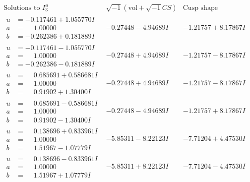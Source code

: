 \documentclass[1p]{elsarticle_modified}
\theoremstyle{definition}
\newcommand{\I}{\sqrt{-1}}
\begin{document}
$$\begin{array}{c|c|c}  
\text{Solutions to }I^u_{3}& \I (\text{vol} + \sqrt{-1}CS) & \text{Cusp shape}\\
 \hline 
\begin{aligned}
u &= -0.117461 + 1.055770 I \\
a &= \phantom{-}1.00000\phantom{ +0.000000I} \\
b &= -0.262386 + 0.181889 I\end{aligned}
 & -0.27448 - 4.94689 I & -1.21757 + 8.17867 I \\ \hline\begin{aligned}
u &= -0.117461 - 1.055770 I \\
a &= \phantom{-}1.00000\phantom{ +0.000000I} \\
b &= -0.262386 - 0.181889 I\end{aligned}
 & -0.27448 + 4.94689 I & -1.21757 - 8.17867 I \\ \hline\begin{aligned}
u &= \phantom{-}0.685691 + 0.586681 I \\
a &= \phantom{-}1.00000\phantom{ +0.000000I} \\
b &= \phantom{-}0.91902 + 1.30400 I\end{aligned}
 & -0.27448 + 4.94689 I & -1.21757 - 8.17867 I \\ \hline\begin{aligned}
u &= \phantom{-}0.685691 - 0.586681 I \\
a &= \phantom{-}1.00000\phantom{ +0.000000I} \\
b &= \phantom{-}0.91902 - 1.30400 I\end{aligned}
 & -0.27448 - 4.94689 I & -1.21757 + 8.17867 I \\ \hline\begin{aligned}
u &= \phantom{-}0.138696 + 0.833961 I \\
a &= \phantom{-}1.00000\phantom{ +0.000000I} \\
b &= \phantom{-}1.51967 - 1.07779 I\end{aligned}
 & -5.85311 - 8.22123 I & -7.71204 + 4.47530 I \\ \hline\begin{aligned}
u &= \phantom{-}0.138696 - 0.833961 I \\
a &= \phantom{-}1.00000\phantom{ +0.000000I} \\
b &= \phantom{-}1.51967 + 1.07779 I\end{aligned}
 & -5.85311 + 8.22123 I & -7.71204 - 4.47530 I \\ \hline\begin{aligned}

\end{aligned}
\end{array}$$
\end{document}
